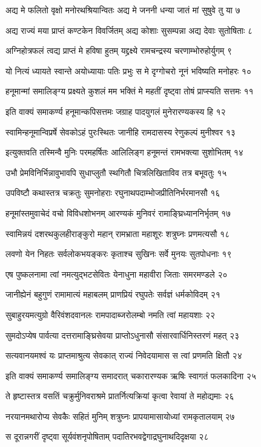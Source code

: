 अद्य मे फलितो वृक्षो मनोरथश्रियान्वितः
अद्य मे जननी धन्या जातं मां सुषुवे तु या ७

अद्य राज्यं मया प्राप्तं कण्टकेन विवर्जितम्
अद्य कोशाः सुसम्पन्ना अद्य देवाः सुतोषिताः ८

अग्निहोत्रफलं त्वद्य प्राप्तं मे हविषा हुतम्
यद्द्रक्ष्ये रामचन्द्रस्य चरणाम्भोरुहोर्युगम् ९

यो नित्यं ध्यायते स्वान्ते अयोध्यायाः पतिः प्रभुः
स मे दृग्गोचरो नूनं भविष्यति मनोहरः १०

हनूमान्मां समालिङ्ग्य प्रक्ष्यते कुशलं मम
भक्तिं मे महतीं दृष्ट्वा तोषं प्राप्स्यति सत्तमः ११

इति वाक्यं समाकर्ण्य हनूमान्कपिसत्तमः
जग्राह पादयुगलं मुनेरारण्यकस्य हि १२

स्वामिन्हनूमान्विप्रर्षे सेवकोऽहं पुरःस्थितः
जानीहि रामदासस्य रेणुकल्पं मुनीश्वर १३

इत्युक्तवति तस्मिन्वै मुनिः परमहर्षितः
आलिलिङ्ग हनूमन्तं रामभक्त्या सुशोभितम् १४

उभौ प्रेमविनिर्भिन्नावुभावपि सुधाप्लुतौ
स्थगितौ चित्रलिखिताविव तत्र बभूवतुः १५

उपविष्टौ कथास्तत्र चक्रतुः सुमनोहराः
रघुनाथपदाम्भोजप्रीतिनिर्भरमानसौ १६

हनूमांस्तमुवाचेदं वचो विविधशोभनम्
आरण्यकं मुनिवरं रामाङ्घ्रिध्याननिर्भृतम् १७

स्वामिन्नयं दशरथकुलहीराङ्कुरो महान्
रामभ्राता महाशूरः शत्रुघ्नः प्रणमत्यसौ १८

लवणो येन निहतः सर्वलोकभयङ्करः
कृताश्च सुखिनः सर्वे मुनयः सुतपोधनाः १९

एष पुष्कलनामा त्वां नमत्युद्भटसेवितः
येनाधुना महावीरा जिताः समरमण्डले २०

जानीह्येनं बहुगुणं रामामात्यं महाबलम्
प्राणप्रियं रघुपतेः सर्वज्ञं धर्मकोविदम् २१

सुबाहुरयमत्युग्रो वैरिवंशदवानलः
रामपादाब्जरोलम्बो नमति त्वां महायशाः २२

सुमदोऽप्येष पार्वत्या दत्तरामाङ्घ्रिसेवया
प्राप्तोऽधुनासौ संसारवार्धिनिस्तरणं महत् २३

सत्यवानयमश्वं यः प्राप्तमाश्रुत्य सेवकात्
राज्यं निवेदयामास स त्वां प्रणमति क्षितौ २४

इति वाक्यं समाकर्ण्य समालिङ्ग्य समादरात्
चकारारण्यक ऋषिः स्वागतं फलकादिना २५

ते हृष्टास्तत्र वसतिं चक्रुर्मुनिवराश्रमे
प्रातर्नित्यक्रियां कृत्वा रेवायां ते महोद्यमाः २६

नरयानमथारोप्य सेवकैः सहितं मुनिम्
शत्रुघ्नः प्रापयामासायोध्यां रामकृतालयाम् २७

स दूरान्नगरीं दृष्ट्वा सूर्यवंशनृपोषिताम्
पदातिरभवद्वेगाद्रघुनाथदिदृक्षया २८

